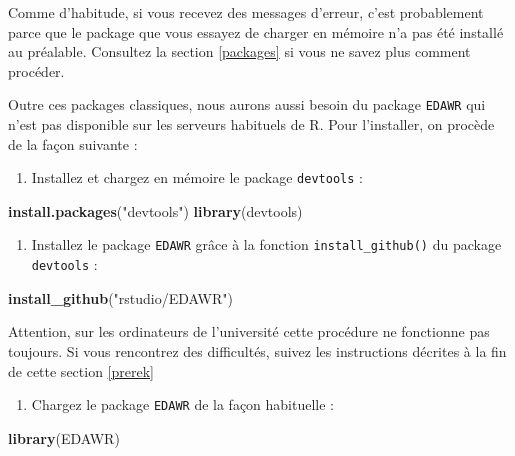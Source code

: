 \documentclass[a4paperpaper,]{article}
\newenvironment{Shaded}{\begin{snugshade}}{\end{snugshade}}
\newcommand{\KeywordTok}[1]{\textcolor[rgb]{0.12,0.11,0.11}{\textbf{#1}}}
\newcommand{\NormalTok}[1]{\textcolor[rgb]{0.12,0.11,0.11}{#1}}
\newcommand{\StringTok}[1]{\textcolor[rgb]{0.75,0.01,0.01}{#1}}
\providecommand{\tightlist}{%
  \setlength{\itemsep}{0pt}\setlength{\parskip}{0pt}}
\begin{document}
Comme d'habitude, si vous recevez des messages d'erreur, c'est probablement parce que le package que vous essayez de charger en mémoire n'a pas été installé au préalable. Consultez la section \ref{packages} si vous ne savez plus comment procéder.

Outre ces packages classiques, nous aurons aussi besoin du package \texttt{EDAWR} qui n'est pas disponible sur les serveurs habituels de R. Pour l'installer, on procède de la façon suivante :

\begin{enumerate}
\def\labelenumi{\arabic{enumi}.}
\tightlist
\item
  Installez et chargez en mémoire le package \texttt{devtools} :
\end{enumerate}

\begin{Shaded}
\begin{Highlighting}[]
\KeywordTok{install.packages}\NormalTok{(}\StringTok{"devtools"}\NormalTok{)}
\KeywordTok{library}\NormalTok{(devtools)}
\end{Highlighting}
\end{Shaded}

\begin{enumerate}
\def\labelenumi{\arabic{enumi}.}
\setcounter{enumi}{1}
\tightlist
\item
  Installez le package \texttt{EDAWR} grâce à la fonction \texttt{install\_github()} du package \texttt{devtools} :
\end{enumerate}

\begin{Shaded}
\begin{Highlighting}[]
\KeywordTok{install_github}\NormalTok{(}\StringTok{"rstudio/EDAWR"}\NormalTok{)}
\end{Highlighting}
\end{Shaded}

Attention, sur les ordinateurs de l'université cette procédure ne fonctionne pas toujours. Si vous rencontrez des difficultés, suivez les instructions décrites à la fin de cette section \ref{prerek}

\begin{enumerate}
\def\labelenumi{\arabic{enumi}.}
\setcounter{enumi}{2}
\tightlist
\item
  Chargez le package \texttt{EDAWR} de la façon habituelle :
\end{enumerate}

\begin{Shaded}
\begin{Highlighting}[]
\KeywordTok{library}\NormalTok{(EDAWR)}
\end{Highlighting}
\end{Shaded}
\end{document}
